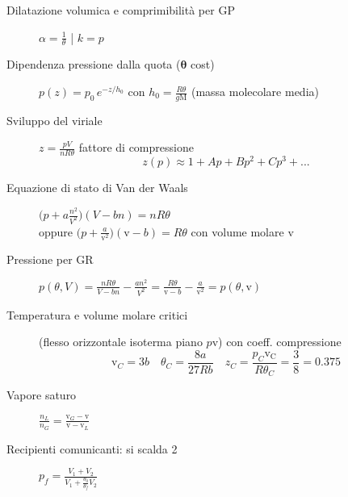 \documentclass[10pt, oneside]{article}
\begin{document}
\begin{description}
\item[Dilatazione volumica e comprimibilità per GP] $\displaystyle \alpha = \frac{1}{\theta}$ \bigg| $k = p$ 
\item[Dipendenza pressione dalla quota ($\mathbf{\theta}$ cost)] $\displaystyle p(z) = p_0 \, e^{- z/h_0}$ con $\displaystyle h_0 = \frac{R \theta}{g \mathrm{M}}$ (massa molecolare media)
\item[Sviluppo del viriale] $\displaystyle z = \frac{pV}{nR\theta}$ fattore di compressione
\[z(p) \approx 1 + A p + B p^2 + C p^3 + ...\]
\item[Equazione di stato di Van der Waals] $\boxed{\displaystyle \big(p + a \frac{n^2}{V^2}\big) (V - bn) = nR\theta}$ 
\\oppure $\displaystyle \big(p + \frac{a}{\mathrm{v}^2}\big) (\mathrm{v} - b) = R \theta$ con volume molare $\mathrm{v}$
\item[Pressione per GR] $\displaystyle p(\theta, V) = \frac{nR\theta}{V - bn} - \frac{an^2}{V^2} = \frac{R\theta}{\mathrm{v} - b} - \frac{a}{\mathrm{v}^2} = p(\theta, \mathrm{v})$
\item[Temperatura e volume molare critici] (flesso orizzontale isoterma piano $p \mathrm{v}$) con coeff. compressione
\[\mathrm{v}_C = 3 b \quad \theta_C = \frac{8 a}{27 R b} \quad z_C = \frac{p_C \mathrm{v_C}}{R \theta_C} = \frac{3}{8} = 0.375\]
\item[Vapore saturo] $\displaystyle \frac{n_L}{n_G} = \frac{\mathrm{v}_G - \mathrm{v}}{\mathrm{v} - \mathrm{v}_L}$
\item[Recipienti comunicanti: si scalda 2] $\displaystyle p_f = \frac{V_1 + V_2}{V_1 + \frac{\theta_0}{\theta_f} V_2}$
\end{description}
\end{document}
